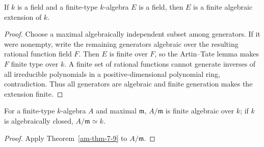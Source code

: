 \begin{theorem}
\label{am-thm-7-9}
\uses{}
If $k$ is a field and a finite-type $k$-algebra $E$ is a field, then $E$ is a
finite algebraic extension of $k$.
\end{theorem}
\begin{proof}
Choose a maximal algebraically independent subset among generators.  If it
were nonempty, write the remaining generators algebraic over the resulting
rational function field $F$.  Then $E$ is finite over $F$, so the Artin--Tate
lemma makes $F$ finite type over $k$.  A finite set of rational functions cannot
generate inverses of all irreducible polynomials in a positive-dimensional
polynomial ring, contradiction.  Thus all generators are algebraic and finite
generation makes the extension finite.
\end{proof}
\begin{corollary}
\label{am-cor-7-10}
\uses{}
For a finite-type $k$-algebra $A$ and maximal $\mathfrak{m}$, $A/\mathfrak{m}$ is finite algebraic
over $k$; if $k$ is algebraically closed, $A/\mathfrak{m}\simeq k$.
\end{corollary}
\begin{proof}
Apply Theorem~\ref{am-thm-7-9} to $A/\mathfrak{m}$.
\end{proof}

